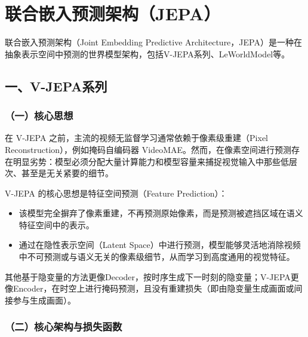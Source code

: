 \setcounter{section}{3}

\hypertarget{ux8054ux5408ux5d4cux5165ux9884ux6d4bux67b6ux6784jepa}{%
\section{联合嵌入预测架构（JEPA）}\label{ux8054ux5408ux5d4cux5165ux9884ux6d4bux67b6ux6784jepa}}

联合嵌入预测架构（Joint Embedding Predictive Architecture，JEPA）是一种在抽象表示空间中预测的世界模型架构，包括V-JEPA系列、LeWorldModel等。

\hypertarget{ux4e00v-jepaux7cfbux5217}{%
\subsection{一、V-JEPA系列}\label{ux4e00v-jepaux7cfbux5217}}

\hypertarget{ux4e00ux6838ux5fc3ux601dux60f3-18}{%
\subsubsection{（一）核心思想}\label{ux4e00ux6838ux5fc3ux601dux60f3-18}}

在 V-JEPA 之前，主流的视频无监督学习通常依赖于像素级重建（Pixel Reconstruction），例如掩码自编码器 VideoMAE。然而，在像素空间进行预测存在明显劣势：模型必须分配大量计算能力和模型容量来捕捉视觉输入中那些低层次、甚至是无关紧要的细节。

V-JEPA 的核心思想是特征空间预测（Feature Prediction）：

\begin{itemize}
\tightlist
\item
  该模型完全摒弃了像素重建，不再预测原始像素，而是预测被遮挡区域在语义特征空间中的表示。
\item
  通过在隐性表示空间（Latent Space）中进行预测，模型能够灵活地消除视频中不可预测或与语义无关的像素级细节，从而学习到高度通用的视觉特征。
\end{itemize}

其他基于隐变量的方法更像Decoder，按时序生成下一时刻的隐变量；V-JEPA更像Encoder，在时空上进行掩码预测，且没有重建损失（即由隐变量生成画面或间接参与生成画面）。

\hypertarget{ux4e8cux6838ux5fc3ux67b6ux6784ux4e0eux635fux5931ux51fdux6570}{%
\subsubsection{（二）核心架构与损失函数}\label{ux4e8cux6838ux5fc3ux67b6ux6784ux4e0eux635fux5931ux51fdux6570}}

